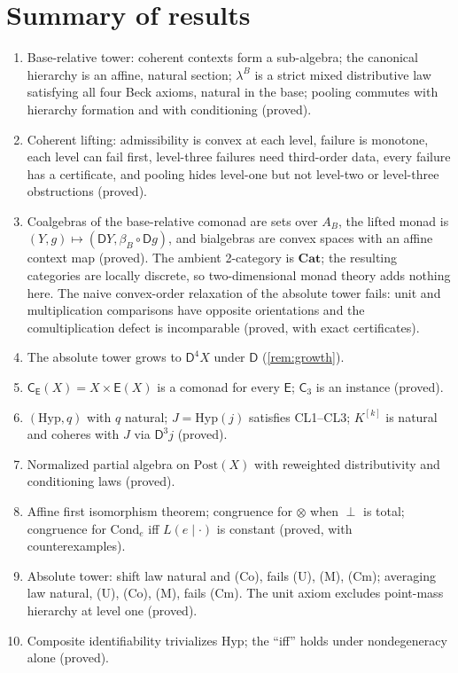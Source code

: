 \documentclass[11pt]{article}
\theoremstyle{definition}
\theoremstyle{remark}
\newcommand{\D}{\mathsf{D}}
\newcommand{\Hyp}{\mathrm{Hyp}}
\newcommand{\Post}{\mathrm{Post}}
\newcommand{\Cond}{\mathrm{Cond}}
\newcommand{\C}{\mathsf{C}}
\newcommand{\E}{\mathsf{E}}
\begin{document}
\section{Summary of results}

\begin{enumerate}[leftmargin=*]
\item Base-relative tower: coherent contexts form a sub-algebra; the canonical hierarchy is an
  affine, natural section; $\lambda^B$ is a strict mixed distributive law satisfying all four Beck
  axioms, natural in the base; pooling commutes with hierarchy formation and with conditioning
  (proved).
\item Coherent lifting: admissibility is convex at each level, failure is monotone, each level can
  fail first, level-three failures need third-order data, every failure has a certificate, and pooling
  hides level-one but not level-two or level-three obstructions (proved).
\item Coalgebras of the base-relative comonad are sets over $A_B$, the lifted monad is
  $(Y,g)\mapsto(\D Y,\beta_B\circ\D g)$, and bialgebras are convex spaces with an affine context map
  (proved). The ambient 2-category is $\mathbf{Cat}$; the resulting categories are locally discrete,
  so two-dimensional monad theory adds nothing here. The naive convex-order relaxation of the
  absolute tower fails: unit and multiplication comparisons have opposite orientations and the
  comultiplication defect is incomparable (proved, with exact certificates).
\item The absolute tower grows to $\D^4X$ under $\D$ (\cref{rem:growth}).
\item $\C_\E(X)=X\times\E(X)$ is a comonad for every $\E$; $\C_3$ is an instance (proved).
\item $(\Hyp,q)$ with $q$ natural; $J=\Hyp(j)$ satisfies CL1--CL3; $K^{[k]}$ is natural and coheres
  with $J$ via $\D^3j$ (proved).
\item Normalized partial algebra on $\Post(X)$ with reweighted distributivity and conditioning laws
  (proved).
\item Affine first isomorphism theorem; congruence for $\otimes$ when $\perp$ is total; congruence for
  $\Cond_e$ iff $L(e\mid\cdot)$ is constant (proved, with counterexamples).
\item Absolute tower: shift law natural and (Co), fails (U), (M), (Cm); averaging law natural,
  (U), (Co), (M), fails (Cm). The unit axiom excludes point-mass hierarchy at level one (proved).
\item Composite identifiability trivializes $\Hyp$; the ``iff'' holds under nondegeneracy alone (proved).
\end{enumerate}
\end{document}
